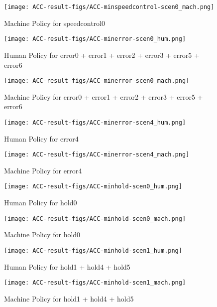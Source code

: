 \begin{figure}[h]
    \texttt{[image: ACC-result-figs/ACC-minspeedcontrol-scen0\_mach.png]}
    \caption{Machine Policy for speedcontrol0}
    \label{fig:speedcontrol-s0-mach}
\end{figure}

\begin{figure}[h]
    \texttt{[image: ACC-result-figs/ACC-minerror-scen0\_hum.png]}
    \caption{Human Policy for error0 + error1 + error2 + error3 + error5 + error6}
    \label{fig:error-s0-hum}
\end{figure}

\begin{figure}[h]
    \texttt{[image: ACC-result-figs/ACC-minerror-scen0\_mach.png]}
    \caption{Machine Policy for error0 + error1 + error2 + error3 + error5 + error6}
    \label{fig:error-s0-mach}
\end{figure}

\begin{figure}[h]
    \texttt{[image: ACC-result-figs/ACC-minerror-scen4\_hum.png]}
    \caption{Human Policy for error4}
    \label{fig:error-s4-hum}
\end{figure}

\begin{figure}[h]
    \texttt{[image: ACC-result-figs/ACC-minerror-scen4\_mach.png]}
    \caption{Machine Policy for error4}
    \label{fig:error-s4-mach}
\end{figure}

\begin{figure}[h]
    \texttt{[image: ACC-result-figs/ACC-minhold-scen0\_hum.png]}
    \caption{Human Policy for hold0}
    \label{fig:hold-s0-hum}
\end{figure}

\begin{figure}[h]
    \texttt{[image: ACC-result-figs/ACC-minhold-scen0\_mach.png]}
    \caption{Machine Policy for hold0}
    \label{fig:hold-s0-mach}
\end{figure}

\begin{figure}[h]
    \texttt{[image: ACC-result-figs/ACC-minhold-scen1\_hum.png]}
    \caption{Human Policy for hold1 + hold4 + hold5}
    \label{fig:hold-s1-hum}
\end{figure}

\begin{figure}[h]
    \texttt{[image: ACC-result-figs/ACC-minhold-scen1\_mach.png]}
    \caption{Machine Policy for hold1 + hold4 + hold5}
    \label{fig:hold-s1-mach}
\end{figure}

